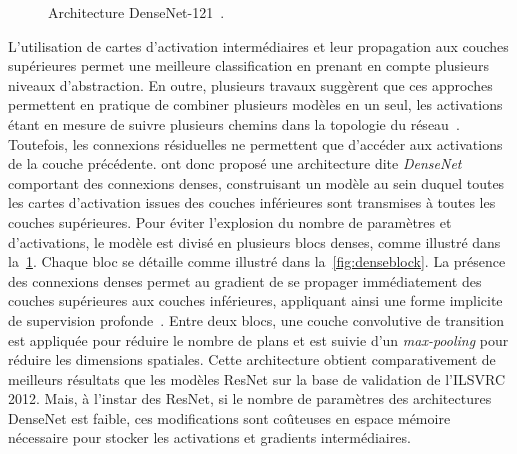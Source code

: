 \begin{figure}[t]
  \resizebox{\textwidth}{!}{
    
  }
  \caption[Architecture DenseNet-121]{Architecture DenseNet-121~\cite{huang_densely_2017}.}
  \label{fig:densenet}
\end{figure}


L'utilisation de cartes d'activation intermédiaires et leur propagation aux couches supérieures permet une meilleure classification en prenant en compte plusieurs niveaux d'abstraction. En outre, plusieurs travaux suggèrent que ces approches permettent en pratique de combiner plusieurs modèles en un seul, les activations étant en mesure de suivre plusieurs chemins dans la topologie du réseau~\cite{veit_residual_2016,huang_deep_2016}. Toutefois, les connexions résiduelles ne permettent que d'accéder aux activations de la couche précédente. \citet{huang_densely_2017} ont donc proposé une architecture dite \emph{DenseNet} comportant des connexions denses, construisant un modèle au sein duquel toutes les cartes d'activation issues des couches inférieures sont transmises à toutes les couches supérieures. Pour éviter l'explosion du nombre de paramètres et d'activations, le modèle est divisé en plusieurs blocs denses, comme illustré dans la~\cref{fig:densenet}. Chaque bloc se détaille comme illustré dans la~\cref{fig:denseblock}. La présence des connexions denses permet au gradient de se propager immédiatement des couches supérieures aux couches inférieures, appliquant ainsi une forme implicite de supervision profonde~\cite{lee_deeply-supervised_2015}. Entre deux blocs, une couche convolutive de transition est appliquée pour réduire le nombre de plans et est suivie d'un \emph{max-pooling} pour réduire les dimensions spatiales. Cette architecture obtient comparativement de meilleurs résultats que les modèles ResNet sur la base de validation de l'\gls{ILSVRC} 2012. Mais, à l'instar des ResNet, si le nombre de paramètres des architectures DenseNet est faible, ces modifications sont coûteuses en espace mémoire nécessaire pour stocker les activations et gradients intermédiaires.

